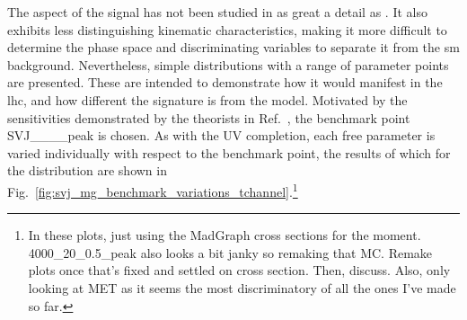 
The \tchannel aspect of the signal has not been studied in as great a detail as \schannel. It also exhibits less distinguishing kinematic characteristics, making it more difficult to determine the phase space and discriminating variables to separate it from the \acrlong{sm} background. Nevertheless, simple distributions with a range of parameter points are presented. These are intended to demonstrate how it would manifest in the \acrshort{lhc}, and how different the signature is from the \schannel model. Motivated by the sensitivities demonstrated by the theorists in Ref.~, the benchmark point SVJ\_\_\_\_\-peak is chosen. As with the \schannel UV completion, each free parameter is varied individually with respect to the benchmark point, the results of which for the \ptmiss distribution are shown in Fig.~\ref{fig:svj_mg_benchmark_variations_tchannel}.\footnote{In these plots, just using the MadGraph cross sections for the moment. 4000\_20\_0.5\_peak also looks a bit janky so remaking that MC. Remake plots once that's fixed and settled on cross section. Then, discuss. Also, only looking at MET as it seems the most discriminatory of all the ones I've made so far.}


